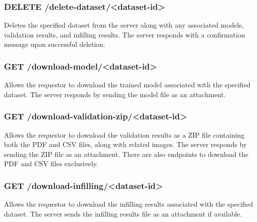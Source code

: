 \subsubsection*{DELETE /delete-dataset/<dataset-id>}

Deletes the specified dataset from the server along with any associated models, validation results, and infilling results.
The server responds with a confirmation message upon successful deletion.

\subsubsection*{GET /download-model/<dataset-id>}

Allows the requestor to download the trained model associated with the specified dataset.
The server responds by sending the model file as an attachment.

\subsubsection*{GET /download-validation-zip/<dataset-id>}

Allows the requestor to download the validation results as a ZIP file containing both the PDF and CSV files, along with related images.
The server responds by sending the ZIP file as an attachment. There are also endpoints to download the PDF and CSV files exclusively.

\subsubsection*{GET /download-infilling/<dataset-id>}

Allows the requestor to download the infilling results associated with the specified dataset.
The server sends the infilling results file as an attachment if available.